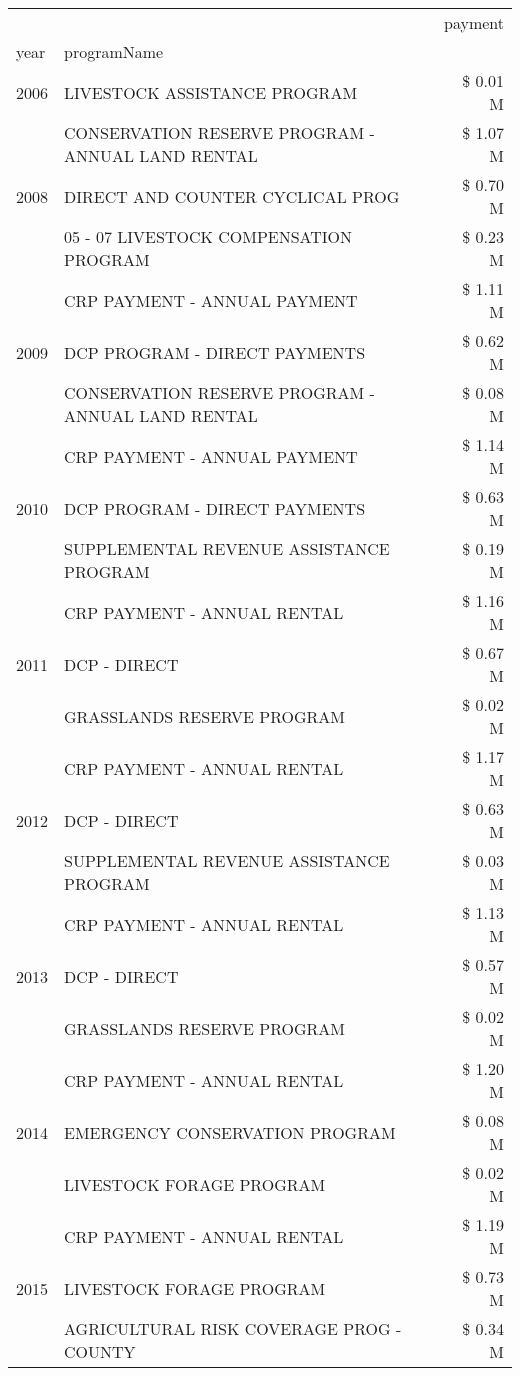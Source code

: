 \begin{tabular}{llr}
\toprule
 &  & payment \\
year & programName &  \\
\midrule
2006 & LIVESTOCK ASSISTANCE PROGRAM & \$ 0.01 M \\
\cline{1-3}
\multirow[t]{3}{*}{2008} & CONSERVATION RESERVE PROGRAM - ANNUAL LAND RENTAL & \$ 1.07 M \\
 & DIRECT AND COUNTER CYCLICAL PROG & \$ 0.70 M \\
 & 05 - 07 LIVESTOCK COMPENSATION PROGRAM & \$ 0.23 M \\
\cline{1-3}
\multirow[t]{3}{*}{2009} & CRP PAYMENT - ANNUAL PAYMENT & \$ 1.11 M \\
 & DCP PROGRAM - DIRECT PAYMENTS & \$ 0.62 M \\
 & CONSERVATION RESERVE PROGRAM - ANNUAL LAND RENTAL & \$ 0.08 M \\
\cline{1-3}
\multirow[t]{3}{*}{2010} & CRP PAYMENT - ANNUAL PAYMENT & \$ 1.14 M \\
 & DCP PROGRAM - DIRECT PAYMENTS & \$ 0.63 M \\
 & SUPPLEMENTAL REVENUE ASSISTANCE PROGRAM & \$ 0.19 M \\
\cline{1-3}
\multirow[t]{3}{*}{2011} & CRP PAYMENT - ANNUAL RENTAL & \$ 1.16 M \\
 & DCP - DIRECT & \$ 0.67 M \\
 & GRASSLANDS RESERVE PROGRAM & \$ 0.02 M \\
\cline{1-3}
\multirow[t]{3}{*}{2012} & CRP PAYMENT - ANNUAL RENTAL & \$ 1.17 M \\
 & DCP - DIRECT & \$ 0.63 M \\
 & SUPPLEMENTAL REVENUE ASSISTANCE PROGRAM & \$ 0.03 M \\
\cline{1-3}
\multirow[t]{3}{*}{2013} & CRP PAYMENT - ANNUAL RENTAL & \$ 1.13 M \\
 & DCP - DIRECT & \$ 0.57 M \\
 & GRASSLANDS RESERVE PROGRAM & \$ 0.02 M \\
\cline{1-3}
\multirow[t]{3}{*}{2014} & CRP PAYMENT - ANNUAL RENTAL & \$ 1.20 M \\
 & EMERGENCY CONSERVATION PROGRAM & \$ 0.08 M \\
 & LIVESTOCK FORAGE PROGRAM & \$ 0.02 M \\
\cline{1-3}
\multirow[t]{3}{*}{2015} & CRP PAYMENT - ANNUAL RENTAL & \$ 1.19 M \\
 & LIVESTOCK FORAGE PROGRAM & \$ 0.73 M \\
 & AGRICULTURAL RISK COVERAGE PROG - COUNTY & \$ 0.34 M \\

\end{tabular}
